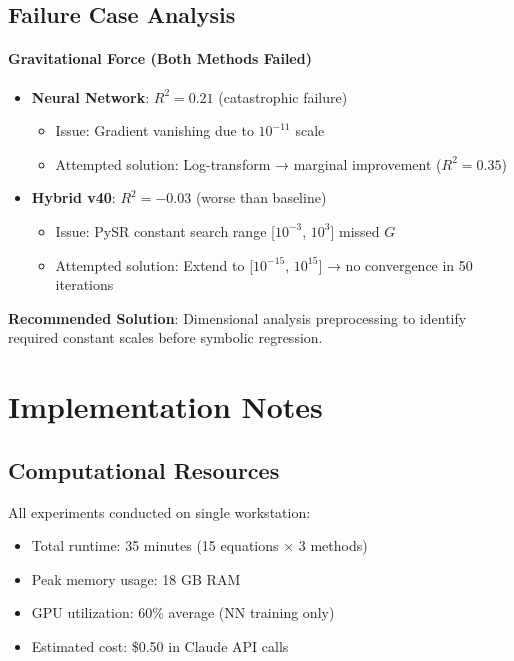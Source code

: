 \subsection{Failure Case Analysis}

\paragraph{Gravitational Force (Both Methods Failed)}

\begin{itemize}
    \item \textbf{Neural Network}: $R^2 = 0.21$ (catastrophic failure)
    \begin{itemize}
        \item Issue: Gradient vanishing due to $10^{-11}$ scale
        \item Attempted solution: Log-transform → marginal improvement ($R^2 = 0.35$)
    \end{itemize}

    \item \textbf{Hybrid v40}: $R^2 = -0.03$ (worse than baseline)
    \begin{itemize}
        \item Issue: PySR constant search range [$10^{-3}$, $10^3$] missed $G$
        \item Attempted solution: Extend to [$10^{-15}$, $10^{15}$] → no convergence in 50 iterations
    \end{itemize}
\end{itemize}

\textbf{Recommended Solution}: Dimensional analysis preprocessing to identify required constant scales before symbolic regression.

\section{Implementation Notes}
\label{app:implementation}

\subsection{Computational Resources}

All experiments conducted on single workstation:
\begin{itemize}
    \item Total runtime: 35 minutes (15 equations × 3 methods)
    \item Peak memory usage: 18 GB RAM
    \item GPU utilization: 60\% average (NN training only)
    \item Estimated cost: \$0.50 in Claude API calls
\end{itemize}

